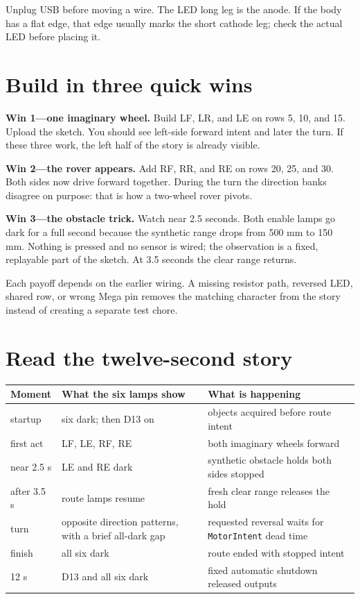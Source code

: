 \documentclass[11pt]{article}
\begin{document}
Unplug USB before moving a wire. The LED long leg is the anode. If the body
has a flat edge, that edge usually marks the short cathode leg; check the
actual LED before placing it.

\section{Build in three quick wins}

\textbf{Win 1---one imaginary wheel.} Build LF, LR, and LE on rows 5, 10, and
15. Upload the sketch. You should see left-side forward intent and later the
turn. If these three work, the left half of the story is already visible.

\textbf{Win 2---the rover appears.} Add RF, RR, and RE on rows 20, 25, and 30.
Both sides now drive forward together. During the turn the direction banks
disagree on purpose: that is how a two-wheel rover pivots.

\textbf{Win 3---the obstacle trick.} Watch near 2.5 seconds. Both enable lamps
go dark for a full second because the synthetic range drops from 500 mm to
150 mm. Nothing is pressed and no sensor is wired; the observation is a fixed,
replayable part of the sketch. At 3.5 seconds the clear range returns.

Each payoff depends on the earlier wiring. A missing resistor path, reversed
LED, shared row, or wrong Mega pin removes the matching character from the
story instead of creating a separate test chore.

\newpage
\section{Read the twelve-second story}

\begin{tabularx}{\linewidth}{@{}l X X@{}}
\toprule
Moment & What the six lamps show & What is happening\\
\midrule
startup & six dark; then D13 on & objects acquired before route intent\\
first act & LF, LE, RF, RE & both imaginary wheels forward\\
near 2.5 s & LE and RE dark & synthetic obstacle holds both sides stopped\\
after 3.5 s & route lamps resume & fresh clear range releases the hold\\
turn & opposite direction patterns, with a brief all-dark gap & requested
reversal waits for \texttt{MotorIntent} dead time\\
finish & all six dark & route ended with stopped intent\\
12 s & D13 and all six dark & fixed automatic shutdown released outputs\\
\bottomrule
\end{tabularx}
\end{document}
